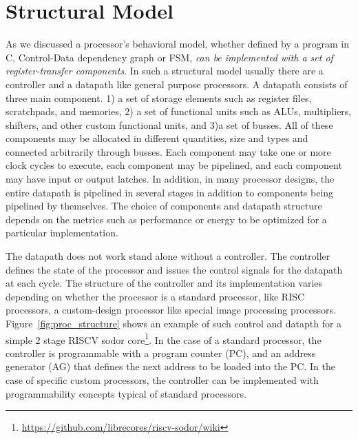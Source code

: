 \section{Structural Model}

As we discussed a processor’s behavioral model, whether defined by a program in C, Control-Data dependency graph or FSM, \emph{can be implemented with a set of register-transfer components}.
In such a structural model usually there are a controller and a datapath like general purpose processors.
A datapath consists of three main component. 1) a set of storage elements such as register files, scratchpads, and memories, 2) a set of functional units such as ALUs, multipliers, shifters, and other custom functional units, and 3)a set of busses.
All of these components may be allocated in different quantities, size and types and connected arbitrarily through busses.
Each component may take one or more clock cycles to execute, each component may be pipelined, and each component may have input or output latches.
In addition, in many processor designs, the entire datapath is pipelined in several stages in addition to components being pipelined by themselves.
The choice of components and datapath structure depends on the metrics such as performance or energy to be optimized for a particular implementation.

The datapath does not work stand alone without a controller.
The controller defines the state of the processor and issues the control signals for the datapath at each cycle.
The structure of the controller and its implementation varies depending on whether the processor is a standard processor, like RISC processors, a custom-design processor like special image processing processors. 
Figure~\ref{fig:proc_structure} shows an example of such control and datapth for a simple 2 stage RISCV sodor core\footnote{\url{https://github.com/librecores/riscv-sodor/wiki}}.
In the case of a standard processor, the controller is programmable with a program counter (PC), and an address generator (AG) that defines the next address to be loaded into the PC.
In the case of specific custom processors, the controller can be implemented with programmability concepts typical of standard processors.



